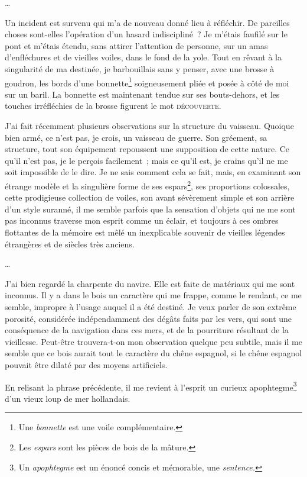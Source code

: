 \documentclass[french,twoside]{book} %
\begin{document}
…\par
\noindent Un incident est survenu qui m’a de nouveau donné lieu à réfléchir. De pareilles choses sont-elles l’opération d’un hasard indiscipliné ? Je m’étais faufilé sur le pont et m’étais étendu, sans attirer l’attention de personne, sur un amas d’enfléchures et de vieilles voiles, dans le fond de la yole. Tout en rêvant à la singularité de ma destinée, je barbouillais sans y penser, avec une brosse à goudron, les bords d’une bonnette\footnote{Une \emph{bonnette} est une voile complémentaire.} soigneusement pliée et posée à côté de moi sur un baril. La bonnette est maintenant tendue sur ses bouts-dehors, et les touches irréfléchies de la brosse figurent le mot {\scshape découverte.}\par
J’ai fait récemment plusieurs observations sur la structure du vaisseau. Quoique bien armé, ce n’est pas, je crois, un vaisseau de guerre. Son gréement, sa structure, tout son équipement repoussent une supposition de cette nature. Ce qu’il n’est pas, je le perçois facilement ; mais ce qu’il est, je crains qu’il ne me soit impossible de le dire. Je ne sais comment cela se fait, mais, en examinant son étrange modèle et la singulière forme de ses espars\footnote{Les \emph{espars} sont les pièces de bois de la mâture.}, ses proportions colossales, cette prodigieuse collection de voiles, son avant sévèrement simple et son arrière d’un style suranné, il me semble parfois que la sensation d’objets qui ne me sont pas inconnus traverse mon esprit comme un éclair, et toujours à ces ombres flottantes de la mémoire est mêlé un inexplicable souvenir de vieilles légendes étrangères et de siècles très anciens.\par
…\par
\noindent J’ai bien regardé la charpente du navire. Elle est faite de matériaux qui me sont inconnus. Il y a dans le bois un caractère qui me frappe, comme le rendant, ce me semble, impropre à l’usage auquel il a été destiné. Je veux parler de son extrême porosité, considérée indépendamment des dégâts faits par les vers, qui sont une conséquence de la navigation dans ces mers, et de la pourriture résultant de la vieillesse. Peut-être trouvera-t-on mon observation quelque peu subtile, mais il me semble que ce bois aurait tout le caractère du chêne espagnol, si le chêne espagnol pouvait être dilaté par des moyens artificiels.\par
En relisant la phrase précédente, il me revient à l’esprit un curieux apophtegme\footnote{Un \emph{apophtegme} est un énoncé concis et mémorable, une \emph{sentence.}} d’un vieux loup de mer hollandais.\par
\end{document}
